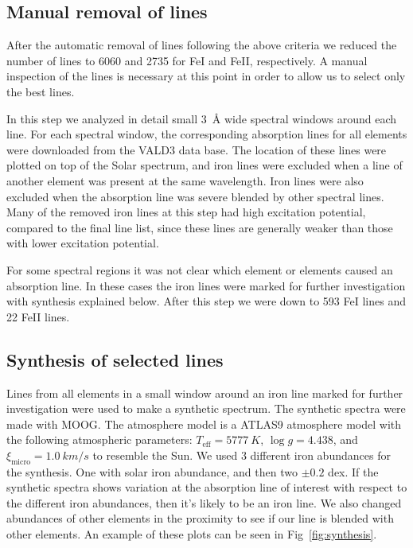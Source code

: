 \documentclass{aa}
\begin{document}
\subsection{Manual removal of lines}
\label{sub:manual_removal_of_lines}

After the automatic removal of lines following the above criteria
we reduced the number of lines to 6060 and 2735 for FeI and FeII,
respectively. A manual inspection of the lines is necessary at this
point in order to allow us to select only the best lines.

In this step we analyzed in detail small \SI{3}{\angstrom} wide spectral
windows around each line. For each spectral window, the corresponding
absorption lines for all elements were downloaded from the VALD3 data
base. The location of these lines were plotted on top of the Solar
spectrum, and iron lines were excluded when a line of another element
was present at the same wavelength. Iron lines were also excluded when
the absorption line was severe blended by other spectral lines. Many
of the removed iron lines at this step had high excitation potential,
compared to the final line list, since these lines are generally weaker
than those with lower excitation potential.

For some spectral regions it was not clear which element or elements
caused an absorption line. In these cases the iron lines were marked for
further investigation with synthesis explained below. After this step
we were down to 593 FeI lines and 22 FeII lines.



\subsection{Synthesis of selected lines}
\label{sub:synthesis_of_selected_lines}

Lines from all elements in a small window around an iron line marked
for further investigation were used to make a synthetic spectrum. The
synthetic spectra were made with MOOG. The atmosphere model is a ATLAS9
atmosphere model \citep{Kurucz1993} with the following atmospheric
parameters: $T_\mathrm{eff}=\SI{5777}{K}$, $\log g = 4.438$, and
$\xi_\mathrm{micro} = \SI{1.0}{km/s}$ to resemble the Sun. We used
3 different iron abundances for the synthesis. One with solar iron
abundance, and then two $\pm0.2$ dex. If the synthetic spectra shows
variation at the absorption line of interest with respect to the
different iron abundances, then it's likely to be an iron line. We also
changed abundances of other elements in the proximity to see if our line
is blended with other elements. An example of these plots can be seen in
Fig~\ref{fig:synthesis}.
\end{document}
